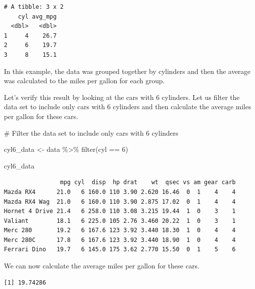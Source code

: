 \documentclass[
  letterpaper,
  DIV=11,
  numbers=noendperiod]{scrreprt}
\newenvironment{Shaded}{\begin{snugshade}}{\end{snugshade}}
\newcommand{\CommentTok}[1]{\textcolor[rgb]{0.37,0.37,0.37}{#1}}
\newcommand{\DecValTok}[1]{\textcolor[rgb]{0.68,0.00,0.00}{#1}}
\newcommand{\FunctionTok}[1]{\textcolor[rgb]{0.28,0.35,0.67}{#1}}
\newcommand{\NormalTok}[1]{\textcolor[rgb]{0.00,0.23,0.31}{#1}}
\newcommand{\OtherTok}[1]{\textcolor[rgb]{0.00,0.23,0.31}{#1}}
\newcommand{\SpecialCharTok}[1]{\textcolor[rgb]{0.37,0.37,0.37}{#1}}
\begin{document}
\begin{verbatim}
# A tibble: 3 x 2
    cyl avg_mpg
  <dbl>   <dbl>
1     4    26.7
2     6    19.7
3     8    15.1
\end{verbatim}

In this example, the data was grouped together by cylinders and then the
average was calculated to the miles per gallon for each group.

Let's verify this result by looking at the cars with 6 cylinders. Let us
filter the data set to include only cars with 6 cylinders and then
calculate the average miles per gallon for these cars.

\begin{Shaded}
\begin{Highlighting}[]
\CommentTok{\# Filter the data set to include only cars with 6 cylinders}

\NormalTok{cyl6\_data }\OtherTok{\textless{}{-}}\NormalTok{ data }\SpecialCharTok{\%\textgreater{}\%}
  \FunctionTok{filter}\NormalTok{(cyl }\SpecialCharTok{==} \DecValTok{6}\NormalTok{)}

\NormalTok{cyl6\_data}
\end{Highlighting}
\end{Shaded}

\begin{verbatim}
                mpg cyl  disp  hp drat    wt  qsec vs am gear carb
Mazda RX4      21.0   6 160.0 110 3.90 2.620 16.46  0  1    4    4
Mazda RX4 Wag  21.0   6 160.0 110 3.90 2.875 17.02  0  1    4    4
Hornet 4 Drive 21.4   6 258.0 110 3.08 3.215 19.44  1  0    3    1
Valiant        18.1   6 225.0 105 2.76 3.460 20.22  1  0    3    1
Merc 280       19.2   6 167.6 123 3.92 3.440 18.30  1  0    4    4
Merc 280C      17.8   6 167.6 123 3.92 3.440 18.90  1  0    4    4
Ferrari Dino   19.7   6 145.0 175 3.62 2.770 15.50  0  1    5    6
\end{verbatim}

We can now calculate the average miles per gallon for these cars.

\begin{Shaded}
\end{Shaded}

\begin{verbatim}
[1] 19.74286
\end{verbatim}
\end{document}
